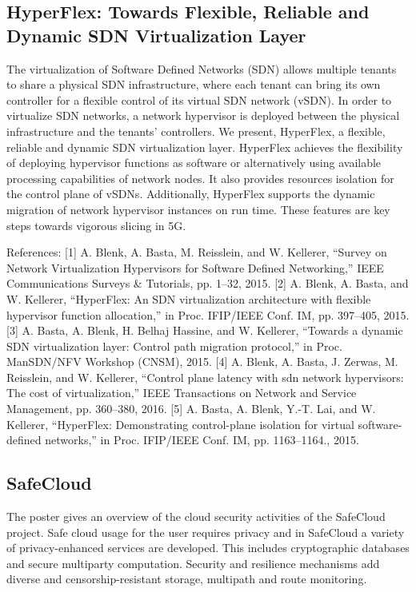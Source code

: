\subsection{HyperFlex: Towards Flexible, Reliable and Dynamic SDN Virtualization Layer}

The virtualization of Software Defined Networks (SDN) allows multiple tenants
to share a physical SDN infrastructure, where each tenant can bring its own
controller for a flexible control of its virtual SDN network (vSDN). In order
to virtualize SDN networks, a network hypervisor is deployed between the
physical infrastructure and the tenants' controllers. We present, HyperFlex, a
flexible, reliable and dynamic SDN virtualization layer. HyperFlex achieves
the flexibility of deploying hypervisor functions as software or alternatively
using available processing capabilities of network nodes. It also provides
resources isolation for the control plane of vSDNs. Additionally, HyperFlex
supports the dynamic migration of network hypervisor instances on run time.
These features are key steps towards vigorous slicing in 5G.

References:
[1] A. Blenk, A. Basta, M. Reisslein, and W. Kellerer, “Survey on Network Virtualization Hypervisors
for Software Defined Networking,” IEEE Communications Surveys \& Tutorials, pp. 1–32, 2015.
[2] A. Blenk, A. Basta, and W. Kellerer, “HyperFlex: An SDN virtualization architecture with flexible
hypervisor function allocation,” in Proc. IFIP/IEEE Conf. IM, pp. 397–405, 2015.
[3] A. Basta, A. Blenk, H. Belhaj Hassine, and W. Kellerer, “Towards a dynamic SDN virtualization
layer: Control path migration protocol,” in Proc. ManSDN/NFV Workshop (CNSM), 2015.
[4] A. Blenk, A. Basta, J. Zerwas, M. Reisslein, and W. Kellerer, “Control plane latency with sdn
network hypervisors: The cost of virtualization,” IEEE Transactions on Network and Service
Management, pp. 360–380, 2016.
[5] A. Basta, A. Blenk, Y.-T. Lai, and W. Kellerer, “HyperFlex: Demonstrating control-plane isolation
for virtual software-defined networks,” in Proc. IFIP/IEEE Conf. IM, pp. 1163–1164., 2015.

\subsection{SafeCloud}

The poster gives an overview of the cloud security activities of the
SafeCloud project. Safe cloud usage for the user requires privacy and in
SafeCloud a variety of privacy-enhanced services are developed. This
includes cryptographic databases and secure multiparty computation.
Security and resilience mechanisms add diverse and censorship-resistant
storage, multipath and route monitoring.

